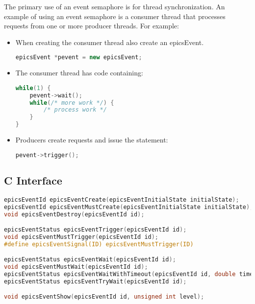 The primary use of an event semaphore is for thread synchronization.
An example of using an event semaphore is a consumer thread that processes requests from one or more producer threads.
For example:

\begin{itemize}
\item When creating the consumer thread also create an epicsEvent.

\begin{lstlisting}[language=C++]
epicsEvent *pevent = new epicsEvent;
\end{lstlisting}

\item The consumer thread has code containing:

\begin{lstlisting}[language=C++]
while(1) {
    pevent->wait();
    while(/* more work */) {
        /* process work */
    }
}
\end{lstlisting}

\item Producers create requests and issue the statement:

\begin{lstlisting}[language=C++]
pevent->trigger();
\end{lstlisting}

\end{itemize}

\subsection{C Interface}

\begin{lstlisting}[language=C]
epicsEventId epicsEventCreate(epicsEventInitialState initialState);
epicsEventId epicsEventMustCreate(epicsEventInitialState initialState);
void epicsEventDestroy(epicsEventId id);

epicsEventStatus epicsEventTrigger(epicsEventId id);
void epicsEventMustTrigger(epicsEventId id);
#define epicsEventSignal(ID) epicsEventMustTrigger(ID)

epicsEventStatus epicsEventWait(epicsEventId id);
void epicsEventMustWait(epicsEventId id);
epicsEventStatus epicsEventWaitWithTimeout(epicsEventId id, double timeOut);
epicsEventStatus epicsEventTryWait(epicsEventId id);

void epicsEventShow(epicsEventId id, unsigned int level);
\end{lstlisting}


